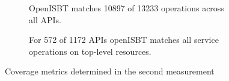 \begin{figure}[!hb]
\centering
\begin{subfigure}[t]{.48\textwidth}
  \centering
  \caption{OpenISBT matches 10897 of 13233 operations across all APIs.}
  \label{fig:analysis2_sub_pie_coverage_sup_operations_main}
\end{subfigure}%
\hfill
\begin{subfigure}[t]{.48\textwidth}
  \centering
  \caption{For 572 of 1172 APIs openISBT matches all service operations on top-level resources.}
  \label{fig:analysis2_sub_pie_coverage_full_sup_apis_main}
\end{subfigure}%
\caption{Coverage metrics determined in the second measurement}
\label{fig:analysis2_pie_both_criteria_main}
\end{figure}
